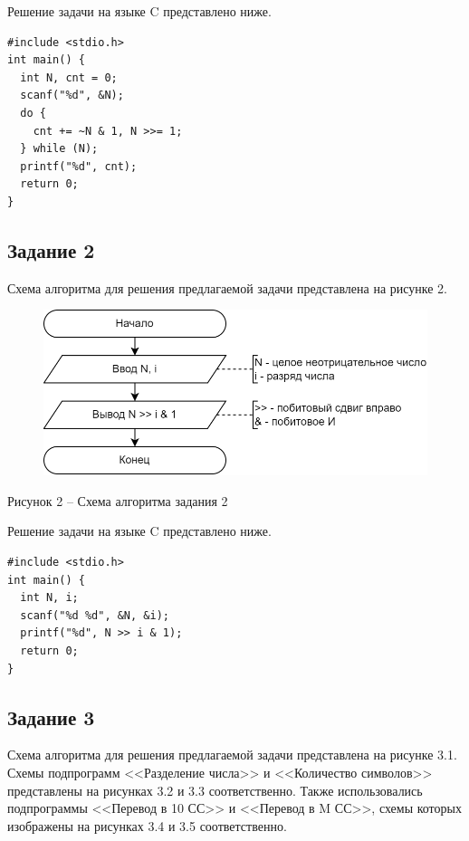 \documentclass[a4paper,14pt]{extarticle}
\begin{document}
  Решение задачи на языке C представлено ниже.

  \begin{lstlisting}[tabsize=2,basicstyle=\ttfamily]
#include <stdio.h>
int main() {
  int N, cnt = 0;
  scanf("%d", &N);
  do {
    cnt += ~N & 1, N >>= 1;
  } while (N);
  printf("%d", cnt);
  return 0;
}
  \end{lstlisting}

  \subsection*{Задание 2}
  Схема алгоритма для решения предлагаемой задачи представлена на рисунке 2.

  \begin{figure}[h]
    \centering
    \includegraphics[width=0.68\linewidth]{schemes/s-2}
  \end{figure}
  \begin{center}
    Рисунок 2 – Схема алгоритма задания 2
  \end{center}

  Решение задачи на языке C представлено ниже.

  \begin{lstlisting}[tabsize=2,basicstyle=\ttfamily]
#include <stdio.h>
int main() {
  int N, i;
  scanf("%d %d", &N, &i);
  printf("%d", N >> i & 1);
  return 0;
}
  \end{lstlisting}

  \newpage
  \subsection*{Задание 3}
  Схема алгоритма для решения предлагаемой задачи представлена на рисунке 3.1. Схемы подпрограмм <<Разделение числа>> и <<Количество символов>> представлены на рисунках 3.2 и 3.3 соответственно. Также использовались подпрограммы <<Перевод в 10 СС>> и <<Перевод в M СС>>, схемы которых изображены на рисунках 3.4 и 3.5 соответственно.
\end{document}
